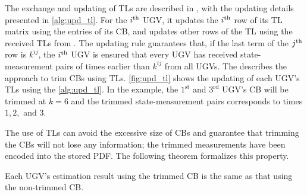 	
	The exchange and updating of TLs are described in , with the updating details presented in \cref{alg:upd_tl}.
	For the $i^\text{th}$ UGV, it updates the $i^\text{th}$ row of its TL matrix using the entries of its CB, and updates other rows of the TL using the received TLs from {\inbhd}.
	The updating rule guarantees that, if the last term of the $j^\text{th}$ row is $k^{ij}$, the $i^\text{th}$ UGV is ensured that every UGV has received state-measurement pairs of times earlier than $k^{ij}$ from all UGVs.
	The  describes the approach to trim CBs using TLs.
%	
	\cref{fig:upd_tl} shows the updating of each UGV's TLs using the \cref{alg:upd_tl}.
	In the example, the $1^\text{st}$ and $3^\text{rd}$ UGV's CB will be trimmed at $k=6$ and the trimmed state-measurement pairs corresponds to times $1,2,$ and $3$.
	
	The use of TLs can avoid the excessive size of CBs and guarantee that trimming the CBs will not lose any information; the trimmed measurements have been encoded into the stored PDF.
	The following theorem formalizes this property.
	
	\begin{thm}\label{thm:trim_no_loss}
		Each UGV's estimation result using the trimmed CB is the same as that using the non-trimmed CB.
	\end{thm}
	

